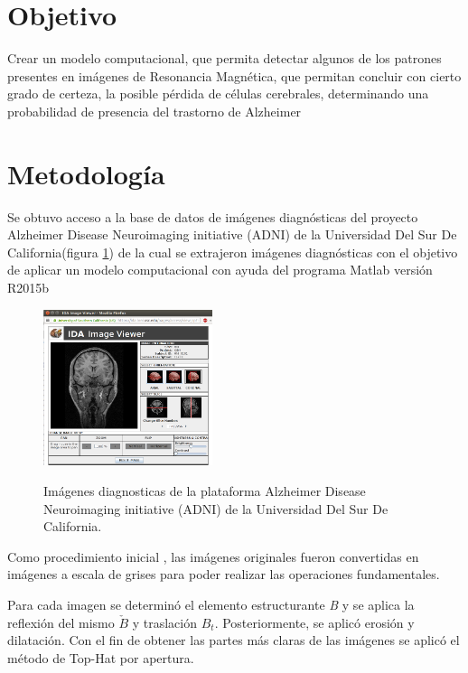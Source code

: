 \documentclass[12pt]{article}
\begin{document}
\section{\color{Black}Objetivo}
\justifying

Crear un modelo computacional, que permita detectar algunos de los patrones presentes en imágenes de Resonancia Magnética, que permitan concluir con cierto grado de certeza, la posible pérdida de células cerebrales, determinando una probabilidad de presencia del trastorno de Alzheimer

\section{\color{Black}Metodología}
\justifying
Se obtuvo acceso a la base de datos de imágenes diagnósticas del proyecto Alzheimer Disease Neuroimaging initiative (ADNI) de la Universidad Del Sur De California(figura \ref{bd}) \cite{BaseDatos} de la cual se extrajeron imágenes diagnósticas con el objetivo de aplicar un modelo computacional con ayuda del programa Matlab versión R2015b

\begin{figure}[htb]
\centering
\includegraphics[width=0.44\textwidth]{patient}\\
\caption{Imágenes diagnosticas de la plataforma Alzheimer Disease Neuroimaging initiative (ADNI) de la Universidad Del Sur De California.\cite{BaseDatos} } \small
\label{bd}
\end{figure}

Como procedimiento inicial , las imágenes originales fueron convertidas en imágenes a escala de grises para poder realizar las operaciones fundamentales.

Para cada imagen se determinó el elemento estructurante \textit{B} y se aplica la  reflexión  del mismo $\check{B}$ y traslación $B_{t}$. Posteriormente, se aplicó erosión y dilatación. Con el fin de obtener las partes más claras de las imágenes se aplicó el método de Top-Hat por apertura.
\end{document}
